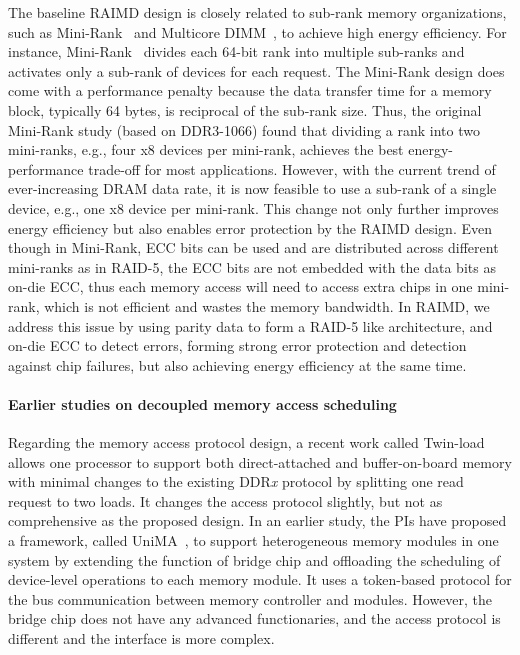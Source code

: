 \documentclass[11pt]{article}
\newcommand{\DDRx}{DDR{\em x}\xspace}
\begin{document}
The baseline RAIMD design is closely related to sub-rank memory organizations,
such as Mini-Rank~\cite{minirank} and Multicore DIMM~\cite{SC09}, to achieve
high energy efficiency.  For instance, Mini-Rank~\cite{minirank} divides each
64-bit rank into multiple sub-ranks and activates only a sub-rank of devices for
each request.  The Mini-Rank design does come with a performance penalty because
the data transfer time for a memory block, typically 64 bytes, is reciprocal of
the sub-rank size.  Thus, the original Mini-Rank study (based on DDR3-1066)
found that dividing a rank into two mini-ranks, e.g., four x8 devices per
mini-rank, achieves the best energy-performance trade-off for most applications.
However, with the current trend of ever-increasing DRAM data rate, it is now
feasible to use a sub-rank of a single device, e.g., one x8 device per
mini-rank.  This change not only further improves energy efficiency but also
enables error protection by the RAIMD design.  Even though in Mini-Rank, ECC
bits can be used and are distributed across different mini-ranks as in RAID-5,
the ECC bits are not embedded with the data bits as on-die ECC, thus each memory
access will need to access extra chips in one mini-rank, which is not efficient
and wastes the memory bandwidth.  In RAIMD, we address this issue by using
parity data to form a RAID-5 like architecture, and on-die ECC to detect errors,
forming strong error protection and detection against chip failures, but also
achieving energy efficiency at the same time.

\paragraph{Earlier studies on decoupled memory access scheduling}

Regarding the memory access protocol design, a recent work called
Twin-load~\cite{Cui:memsys16} allows one processor to support both
direct-attached and buffer-on-board memory with minimal changes to the existing
\DDRx protocol by splitting one read request to two loads.  It changes the
access protocol slightly, but not as comprehensive as the proposed design.  In
an earlier study, the PIs have proposed a framework, called
UniMA~\cite{Fang:pact11}, to support heterogeneous memory modules in one system by extending the
function of bridge chip and offloading the scheduling of device-level operations
to each memory module.  It uses a token-based protocol for the bus communication
between memory controller and modules.  However, the bridge chip does not have
any advanced functionaries, and the access protocol is different and the
interface is more complex.
\end{document}
